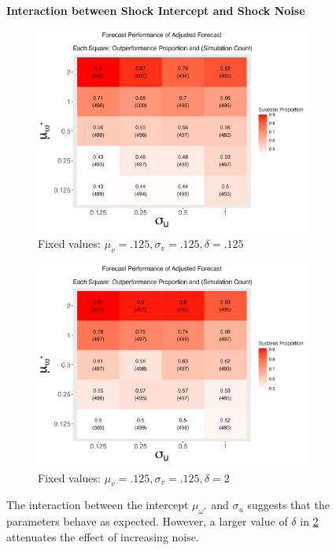 \documentclass{uiucthesis2021}
\theoremstyle{definition}
\begin{document}
\begin{figure}[!h]
  \centering
  \textbf{Interaction between Shock Intercept and Shock Noise}\par\medskip
\begin{subfigure}{.44\linewidth} 
  \centering
    \includegraphics[scale = .42]{simulation_plots/Aug28_224451_2024_mu[omega^*]_sigma[u].png}
    \caption{Fixed values: $\mu_{v} = .125, \sigma_{v} = .125, \delta = .125$}\label{fig:sim_6}
\end{subfigure}\hspace{12mm} %
\begin{subfigure}{.44\linewidth} 
  \centering
    \includegraphics[scale=.42]{simulation_plots/Aug28_224455_2024_mu[omega^*]_sigma[u].png}
    \caption{Fixed values: $\mu_{v} = .125, \sigma_{v} = .125, \delta = 2$}\label{fig:sim_7}
\end{subfigure}

    \caption{The interaction between the intercept $\mu_{\omega^{*}}$ and $\sigma_{u}$ suggests that the parameters behave as expected.  However, a larger value of $\delta$ in \ref{fig:sim_7} attenuates the effect of increasing noise.}
    \label{fig:intercept_noise}
  \end{figure}
\end{document}

